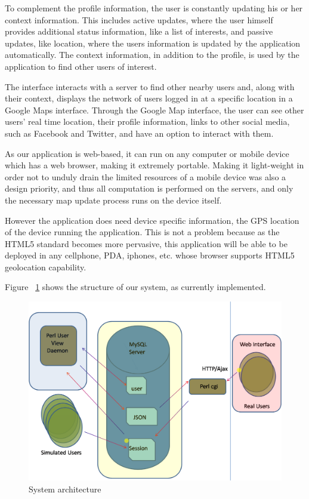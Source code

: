 \documentclass[11pt]{article}
\begin{document}
To complement the profile information, the user is constantly updating his or her context information. This includes active updates, where the user himself provides additional status information, like a list of interests, and passive updates, like location, where the users information is updated by the application automatically. The context information, in addition to the profile, is used by the application to find other users of interest. 

The interface interacts with a server to find other nearby users and, along with their context, displays the network of users logged in at a specific location in a Google Maps interface. Through the Google Map interface, the user can see other users' real time location, their profile information, links to other social media, such as Facebook and Twitter, and have an option to interact with them. 


As our application is web-based, it can run on any computer or mobile device which has a web browser, making it extremely portable. Making it light-weight in order not to unduly drain the limited resources of a mobile device was also a design priority, and thus all computation is performed on the servers, and only the necessary map update process runs on the device itself. 

However the application does need device specific information, the GPS location of the device running the application. This is not a problem because as the HTML5 standard becomes more pervasive, this application will be able to be deployed in any cellphone, PDA, iphones, etc. whose browser supports HTML5 geolocation capability.

Figure ~\ref{fig:arch} shows the structure of our system, as currently implemented. 
 
\begin{figure}[h]
\begin{center}
  \includegraphics[scale=0.5]{sysarch.png}
\caption{System architecture}
\label{fig:arch} 
\end{center}
\end{figure}
\end{document}
